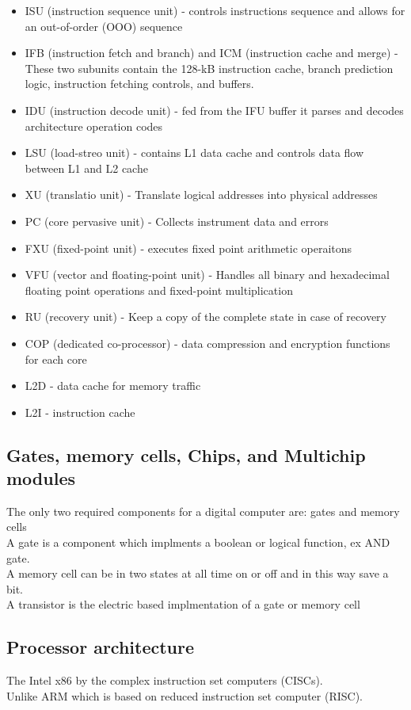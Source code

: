 \documentclass[12pt, a4paper]{article}
\begin{document}
			\begin{itemize}
				\item ISU (instruction sequence unit) - controls instructions sequence and allows for an out-of-order (OOO) sequence
				\item IFB (instruction fetch and branch) and ICM (instruction cache and merge) - These two subunits contain the 128-kB instruction cache, branch prediction logic, instruction fetching controls, and buffers.
				\item IDU (instruction decode unit) - fed from the IFU buffer it parses and decodes architecture operation codes
				\item LSU (load-streo unit) - contains L1 data cache and controls data flow between L1 and L2 cache
				\item XU (translatio unit) - Translate logical addresses into physical addresses
				\item PC (core pervasive unit) - Collects instrument data and errors
				\item FXU (fixed-point unit) - executes fixed point arithmetic operaitons
				\item VFU (vector and floating-point unit) - Handles all binary and hexadecimal floating point operations and fixed-point multiplication
				\item RU (recovery unit) - Keep a copy of the complete state in case of recovery
				\item COP (dedicated co-processor) - data compression and encryption functions for each core
				\item L2D - data cache for memory traffic
				\item L2I - instruction cache
			\end{itemize}
		\subsection{Gates, memory cells, Chips, and Multichip modules}
			The only two required components for a digital computer are: gates and memory cells\\
			A gate is a component which implments a boolean or logical function, ex AND gate.\\
			A memory cell can be in two states at all time on or off and in this way save a bit.\\
			A transistor is the electric based implmentation of a gate or memory cell\\
		\subsection{Processor architecture}
			The Intel x86 by the complex instruction set computers (CISCs).\\
			Unlike ARM which is based on reduced instruction set computer (RISC).\\
\end{document}
